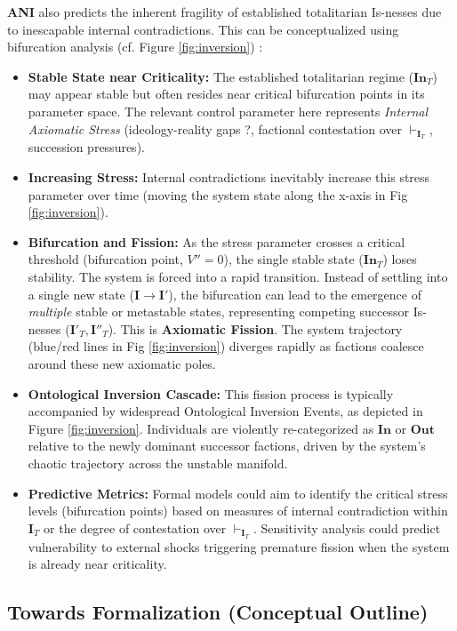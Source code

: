 \documentclass{article}
\newcommand{\ANI}{\textbf{ANI}}             %
\newcommand{\Isness}{\mathbf{I}}            %
\newcommand{\Inness}{\mathbf{In}}           %
\newcommand{\Outness}{\mathbf{Out}}         %
\newcommand{\validates}[1]{\ensuremath{\vdash_{#1}}} %
\begin{document}
\ANI{} also predicts the inherent fragility of established totalitarian Is-nesses due to inescapable internal contradictions. This can be conceptualized using bifurcation analysis (cf. Figure \ref{fig:inversion}) \citep{Prigogine1984}:
\begin{itemize}
    \item \textbf{Stable State near Criticality:} The established totalitarian regime ($\Inness_T$) may appear stable but often resides near critical bifurcation points in its parameter space. The relevant control parameter here represents \textit{Internal Axiomatic Stress} (ideology-reality gaps \citep{Festinger1956}?, factional contestation over $\validates{\Isness_T}$, succession pressures).
    \item \textbf{Increasing Stress:} Internal contradictions inevitably increase this stress parameter over time (moving the system state along the x-axis in Fig \ref{fig:inversion}).
    \item \textbf{Bifurcation and Fission:} As the stress parameter crosses a critical threshold (bifurcation point, $V''=0$), the single stable state ($\Inness_T$) loses stability. The system is forced into a rapid transition. Instead of settling into a single new state ($\Isness \rightarrow \Isness'$), the bifurcation can lead to the emergence of \textit{multiple} stable or metastable states, representing competing successor Is-nesses ($\Isness'_T, \Isness''_T$). This is \textbf{Axiomatic Fission}. The system trajectory (blue/red lines in Fig \ref{fig:inversion}) diverges rapidly as factions coalesce around these new axiomatic poles.
    \item \textbf{Ontological Inversion Cascade:} This fission process is typically accompanied by widespread Ontological Inversion Events, as depicted in Figure \ref{fig:inversion}. Individuals are violently re-categorized as $\Inness$ or $\Outness$ relative to the newly dominant successor factions, driven by the system's chaotic trajectory across the unstable manifold.
    \item \textbf{Predictive Metrics:} Formal models could aim to identify the critical stress levels (bifurcation points) based on measures of internal contradiction within $\Isness_T$ or the degree of contestation over $\validates{\Isness_T}$. Sensitivity analysis could predict vulnerability to external shocks triggering premature fission when the system is already near criticality.
\end{itemize}

\subsection{Towards Formalization (Conceptual Outline)}
\end{document}
